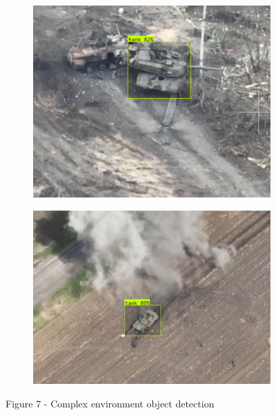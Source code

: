 \begin{figure}[H]
    \centering
    \begin{subfigure}[b]{0.45\textwidth}
        \centering
        \includegraphics[height=0.75\linewidth]{assets/21}
    \end{subfigure}\hfill
    \begin{subfigure}[b]{0.45\textwidth}
        \centering
        \includegraphics[height=0.75\linewidth]{assets/22}
    \end{subfigure}
	\caption*{Figure 7 - Complex environment object detection}
\end{figure}

